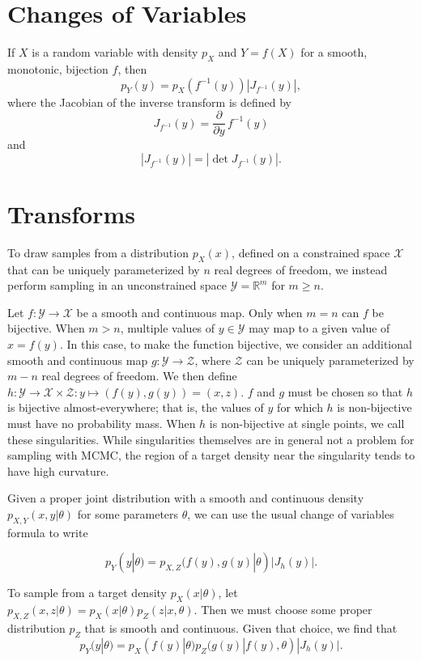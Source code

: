 \documentclass[11pt]{article}
\newcommand{\abs}[1]{\left| #1 \right|}
\newcommand{\absdet}[1]{\abs{#1}}
\begin{document}
\section{Changes of Variables}

If $X$ is a random variable with density $p_X$ and $Y = f(X)$ for a
smooth, monotonic, bijection $f$, then
\[
  p_Y(y) = p_X(f^{-1}(y)) \absdet{J_{f^{-1}}(y)},
\]
where the Jacobian of the inverse transform is defined by
\[
  J_{f^{-1}}(y) = \frac{\partial}{\partial y} \, f^{-1}(y)
\]
and
\[
  \absdet{J_{f^{-1}}(y)}
  = \abs{\det J_{f^{-1}}(y)}.
\]

\section{Transforms}

To draw samples from a distribution $p_X(x)$, defined on a constrained space $\mathcal{X}$ that can be uniquely parameterized by $n$ real degrees of freedom, we instead perform sampling in an unconstrained space $\mathcal{Y}=\mathbb{R}^m$ for $m \ge n$.

Let $f\colon \mathcal{Y} \to \mathcal{X}$ be a smooth and continuous map.
Only when $m = n$ can $f$ be bijective.
When $m > n$, multiple values of $y \in \mathcal{Y}$ may map to a given value of $x = f(y)$.
In this case, to make the function bijective, we consider an additional smooth and continuous map $g\colon \mathcal{Y} \to \mathcal{Z}$, where $\mathcal{Z}$ can be uniquely parameterized by $m - n$ real degrees of freedom.
We then define $h\colon \mathcal{Y} \to \mathcal{X} \times \mathcal{Z}: y \mapsto (f(y), g(y)) = (x, z)$.
$f$ and $g$ must be chosen so that $h$ is bijective almost-everywhere;
that is, the values of $y$ for which $h$ is non-bijective must have no probability mass.
When $h$ is non-bijective at single points, we call these singularities.
While singularities themselves are in general not a problem for sampling with MCMC, the region of a target density near the singularity tends to have high curvature.

Given a proper joint distribution with a smooth and continuous density $p_{X,Y}(x, y | \theta)$ for some parameters $\theta$, we can use the usual change of variables formula to write

\[
  p_Y(y | \theta) = p_{X,Z}(f(y), g(y) | \theta) |J_h(y)|.
\]

To sample from a target density $p_X(x | \theta)$, let $p_{X,Z}(x, z | \theta) = p_X(x | \theta) p_Z(z | x, \theta)$.
Then we must choose some proper distribution $p_Z$ that is smooth and continuous.
Given that choice, we find that
\[
  p_Y(y | \theta) = p_X(f(y) | \theta) p_Z(g(y) | f(y), \theta) |J_h(y)|.
\]
\end{document}
